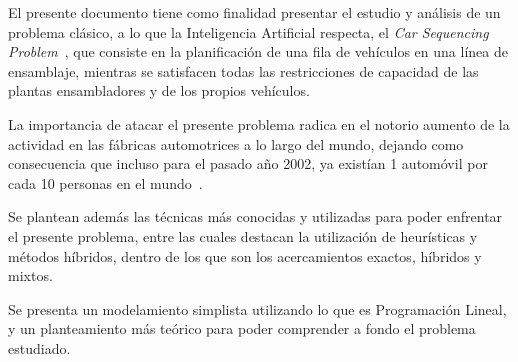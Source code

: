 El presente documento tiene como finalidad presentar el estudio y análisis de un problema clásico, a lo que la Inteligencia Artificial respecta,
el \emph{Car Sequencing Problem}~\cite{parello}, que consiste en la planificación de una fila de vehículos en una línea de ensamblaje, 
mientras se satisfacen todas las restricciones de capacidad de las plantas ensambladores y de los propios vehículos.

La importancia de atacar el presente problema radica en el notorio aumento de la actividad en las fábricas automotrices a lo largo del mundo,
dejando como consecuencia que incluso para el pasado año 2002, ya existían 1 automóvil por cada 10 personas en el mundo~\cite{worldmapper}.

Se plantean además las técnicas más conocidas y utilizadas para poder enfrentar el presente problema, entre las cuales destacan la utilización
de heurísticas y métodos híbridos, dentro de los que son los acercamientos exactos, híbridos y mixtos.

Se presenta un modelamiento simplista utilizando lo que es Programación Lineal, y un planteamiento más teórico para poder comprender a fondo
el problema estudiado.



